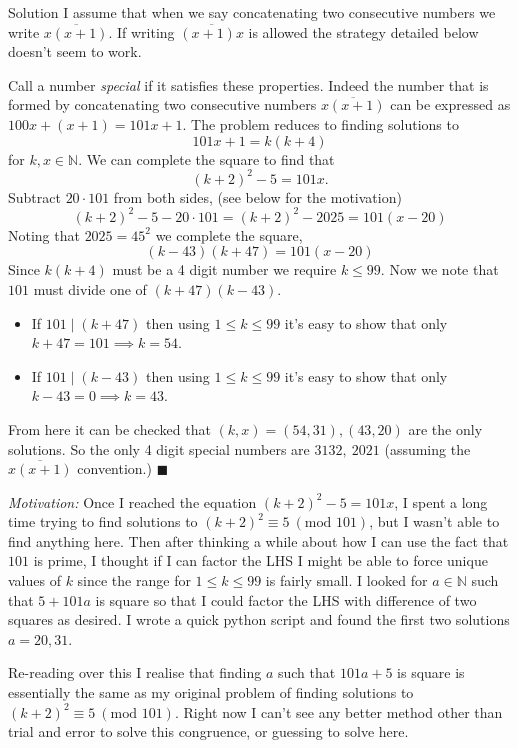 \documentclass{article}
\begin{document}
\begin{solution}{Solution}
I assume that when we say concatenating two consecutive numbers we write
$\overline{x(x+1)}$. If writing $\overline{(x+1)x}$ is allowed the strategy
detailed below doesn't seem to work. \vspace{0.2cm}

Call a number \textit{special} if it satisfies these properties.
Indeed the number that is formed by concatenating two consecutive numbers
$\overline{x(x+1)}$ can be expressed as $100x + (x+1) = 101x + 1$.
The problem reduces to finding solutions to
$$
101x + 1 = k(k+4)
$$
for $k,x \in \mathbb{N}$.
We can complete the square to find that
$$
(k+2)^2 - 5 = 101x.
$$
Subtract $20\cdot 101$ from both sides, (see below for the motivation)
$$
(k+2)^2 - 5 - 20\cdot 101 = (k+2)^2 - 2025 = 101(x-20)
$$
Noting that $2025 = 45^2$ we complete the square,
$$
(k-43)(k+47) = 101(x-20)
$$
Since $k(k+4)$ must be a 4 digit number we require $k \leq 99$.
Now we note that $101$ must divide one of $(k+47)(k-43)$.

\begin{itemize}
\item If $101 \mid (k+47)$ then using $1 \leq k \leq 99$ it's easy to show that only
$k + 47 = 101 \implies k = 54$.
\item If $101 \mid (k-43)$ then using $1\leq k \leq 99$ it's easy to show that only
$k-43 = 0 \implies k = 43$.
\end{itemize}

From here it can be checked that $(k,x) = (54, 31), (43, 20)$ are the
only solutions. So the only 4 digit special numbers are $3132, \ 2021$
(assuming the $\overline{x(x+1)}$ convention.) $\blacksquare$
\vspace{1.0cm}

\textit{Motivation:} Once I reached the equation $(k+2)^2 - 5 = 101x$, I
spent a long time trying to find solutions to
$(k+2)^2 \equiv 5 \ (\text{mod } 101)$, but I wasn't able to find anything
here. Then after thinking a while about how I can use the fact that $101$
is prime, I thought if I can factor the LHS I might be able to force
unique values of $k$ since the range for $1 \leq k \leq 99$ is fairly
small. I looked for $a\in \mathbb{N}$ such that $5 + 101a$ is square
so that I could factor the LHS with difference of two squares as desired.
I wrote a quick python script and found the first two solutions $a=20,31$.
\vspace{0.2cm}

Re-reading over this I realise that finding $a$ such that $101a + 5$ is
square is essentially the same as my original problem of finding
solutions to $(k+2)^2 \equiv 5 \ (\text{mod } 101)$. Right now I can't see
any better method other than trial and error to solve this congruence, or
guessing to solve here.
\end{solution}
\newpage
\end{document}
